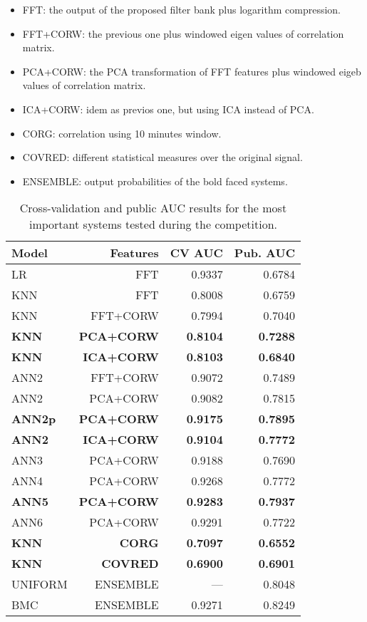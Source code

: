\documentclass[a4paper,english,twoside]{article}
\begin{document}
\begin{itemize}
\item
  FFT: the output of the proposed filter bank plus logarithm
  compression.
\item
  FFT+CORW: the previous one plus windowed eigen values of correlation
  matrix.
\item
  PCA+CORW: the PCA transformation of FFT features plus windowed eigeb
  values of correlation matrix.
\item
  ICA+CORW: idem as previos one, but using ICA instead of PCA.
\item
  CORG: correlation using 10 minutes window.
\item
  COVRED: different statistical measures over the original signal.
\item
  ENSEMBLE: output probabilities of the bold faced systems.
\end{itemize}

\begin{table}
  \centering
  \begin{tabular}{|l|r|rr|}
    \hline
    Model & Features & CV AUC & Pub. AUC\\
    \hline
    \hline
    LR & FFT & 0.9337 & 0.6784\\
    \hline
    KNN & FFT & 0.8008 & 0.6759\\
    KNN & FFT+CORW & 0.7994 & 0.7040\\
    \textbf{KNN} & \textbf{PCA+CORW} & \textbf{0.8104} & \textbf{0.7288}\\
    \textbf{KNN} & \textbf{ICA+CORW} & \textbf{0.8103} & \textbf{0.6840}\\
    \hline
    ANN2 & FFT+CORW & 0.9072 & 0.7489\\
    ANN2 & PCA+CORW & 0.9082 & 0.7815\\
    \textbf{ANN2p} & \textbf{PCA+CORW} & \textbf{0.9175} & \textbf{0.7895}\\
    \textbf{ANN2} & \textbf{ICA+CORW} & \textbf{0.9104} & \textbf{0.7772}\\
    ANN3 & PCA+CORW & 0.9188 & 0.7690\\
    ANN4 & PCA+CORW & 0.9268 & 0.7772\\
    \textbf{ANN5} & \textbf{PCA+CORW} & \textbf{0.9283} & \textbf{0.7937}\\
    ANN6 & PCA+CORW & 0.9291 & 0.7722\\
    \hline
    \textbf{KNN} & \textbf{CORG} & \textbf{0.7097} & \textbf{0.6552}\\
    \textbf{KNN} & \textbf{COVRED} & \textbf{0.6900} & \textbf{0.6901}\\
    \hline
    UNIFORM & ENSEMBLE & --- & 0.8048\\
    BMC & ENSEMBLE & 0.9271 & 0.8249\\
    \hline
  \end{tabular}
  \caption{Cross-validation and public AUC results for the most important systems tested during the competition.\label{tab:val}}
\end{table}            
\end{document}
